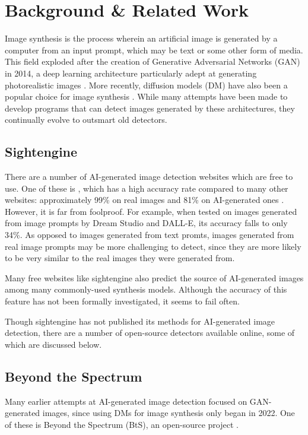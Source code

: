 \documentclass{article} %
\begin{document}
\section{Background \& Related Work}
\label{background}

Image synthesis is the process wherein an artificial image is generated by a computer from an input prompt, which may be text or some other form of media. This field exploded after the creation of Generative Adversarial Networks (GAN) in 2014, a deep learning architecture particularly adept at generating photorealistic images \citep{GANfather}. More recently, diffusion models (DM) have also been a popular choice for image synthesis \citep{latent-diffusion}. While many attempts have been made to develop programs that can detect images generated by these architectures, they continually evolve to outsmart old detectors.

\subsection{Sightengine}

There are a number of AI-generated image detection websites which are free to use. One of these is \citet{sightengine}, which has a high accuracy rate compared to many other websites: approximately 99\% on real images and 81\% on AI-generated ones \citep{li2024adversarialaiartunderstandinggeneration}. However, it is far from foolproof. For example, when tested on images generated from image prompts by Dream Studio and DALL-E, its accuracy falls to only 34\%. As opposed to images generated from text promts, images generated from real image prompts may be more challenging to detect, since they are more likely to be very similar to the real images they were generated from.

Many free websites like sightengine also predict the source of AI-generated images among many commonly-used synthesis models. Although the accuracy of this feature has not been formally investigated, it seems to fail often.

Though sightengine has not published its methods for AI-generated image detection, there are a number of open-source detectors available online, some of which are discussed below.

\subsection{Beyond the Spectrum}

Many earlier attempts at AI-generated image detection focused on GAN-generated images, since using DMs for image synthesis only began in 2022. One of these is Beyond the Spectrum (BtS), an open-source project \citep{he2021spectrumdetectingdeepfakesresynthesis}.
\end{document}
